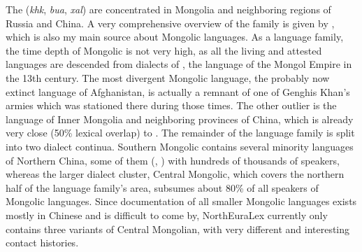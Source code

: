 The  (\textit{khk}, \textit{bua}, \textit{xal}) are concentrated in Mongolia and neighboring regions of Russia and China. A very comprehensive overview of the family is given by \cite{janhunen2003}, which is also my main source about Mongolic languages. As a language family, the time depth of Mongolic is not very high, as all the living and attested languages are descended from dialects of , the language of the Mongol Empire in the 13th century. The most divergent Mongolic language, the probably now extinct  language of Afghanistan, is actually a remnant of one of Genghis Khan's armies which was stationed there during those times. The other outlier is the  language of Inner Mongolia and neighboring provinces of China, which is already very close (50\% lexical overlap) to . The remainder of the language family is split into two dialect continua. Southern Mongolic contains several minority languages of Northern China, some of them (, ) with hundreds of thousands of speakers, whereas the larger dialect cluster, Central Mongolic, which covers the northern half of the language family's area, subsumes about 80\% of all speakers of Mongolic languages. Since documentation of all smaller Mongolic languages exists mostly in Chinese and is difficult to come by, NorthEuraLex currently only contains three variants of Central Mongolian, with very different and interesting contact histories.

